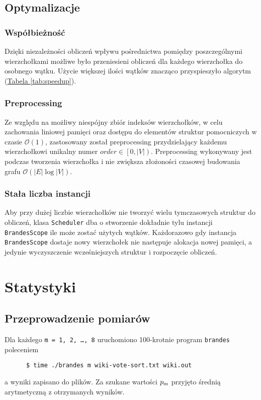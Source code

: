 \documentclass{article}
\begin{document}
    \subsection{Optymalizacje}
      \subsubsection{Współbieżność} Dzięki niezależności obliczeń wpływu pośrednictwa
      pomiędzy poszczególnymi wierzchołkami możliwe było przeniesieni obliczeń dla
      każdego wierzchołka do osobnego wątku. Użycie większej ilości wątków znacząco
      przyspieszyło algorytm (\hyperref[tab:speedup]{Tabela \ref*{tab:speedup}}).

      \subsubsection{Preprocessing} Ze względu na możliwy niespójny zbiór indeksów
      wierzchołków, w celu zachowania liniowej pamięci oraz dostępu do elementów
      struktur pomocniczych w czasie $\mathcal{O}(1)$, zastosowany został
      preprocessing przydzielający każdemu wierzchołkowi unikalny numer
      $order \in \left[0, |V|\right)$. Preprocessing wykonywany jest podczas tworzenia
      wierzchołka i nie zwiększa złożoności czasowej budowania grafu $\mathcal{O}(|E|\log|V|)$.

      \subsubsection{Stała liczba instancji} Aby przy dużej liczbie wierzchołków nie
      tworzyć wielu tymczasowych struktur do obliczeń, klasa \texttt{Scheduler} dba o
      stworzenie dokładnie tylu instancji \texttt{BrandesScope} ile może zostać
      użytych wątków. Każdorazowo gdy instancja \texttt{BrandesScope} dostaje
      nowy wierzchołek nie następuje alokacja nowej pamięci, a jedynie wyczyszczenie
      wcześniejszych struktur i rozpoczęcie obliczeń.

  \newpage
  \section{Statystyki}
    \subsection{Przeprowadzenie pomiarów}
    Dla każdego \texttt{m = 1, 2, \ldots, 8} uruchomiono 100-krotnie program
    \texttt{brandes} poleceniem
    \begin{verbatim}
      $ time ./brandes m wiki-vote-sort.txt wiki.out
    \end{verbatim}
    \vspace{-3ex}
    a wyniki zapisano do plików. Za szukane wartości $p\textsubscript{m}$ przyjęto
    średnią arytmetyczną z otrzymanych wyników.
\end{document}
